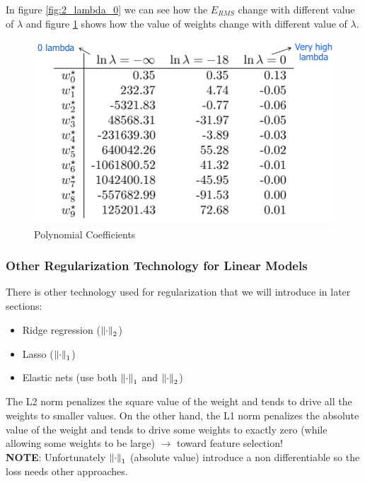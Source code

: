 \documentclass[../main.tex]{subfiles}
\begin{document}
In figure \ref{fig:2_lambda_0} we can see how the $E_{RMS}$ change with different value of $\lambda$ and figure \ref{fig:2_poly_coeff_with_reg} shows how the value of weights change with different value of $\lambda$.

\begin{figure}[H]
    \centering
    \includegraphics[scale = 0.3]{lectures/2_linear_model/2_polynomial_coefficients.png}
    \caption{Polynomial Coefficients}
    \label{fig:2_poly_coeff_with_reg}
\end{figure}


\subsubsection{Other Regularization Technology for Linear Models}
There is other technology used for regularization that we will introduce in later sections:
\begin{itemize}
    \item Ridge regression ($\left\lVert\cdot\right\rVert_2$)
    \item Lasso ($\left\lVert\cdot\right\rVert_1$)
    \item Elastic nets (use both $\left\lVert\cdot\right\rVert_1$ and $\left\lVert\cdot\right\rVert_2$)
\end{itemize}

The L2 norm penalizes the square value of the weight and tends to drive all the weights to smaller values. On the other hand, the L1 norm penalizes the absolute value of the weight and tends to drive some weights to exactly zero (while allowing some weights to be large) $\rightarrow$ toward feature selection!\\

\textbf{NOTE}: Unfortunately $\left\lVert\cdot\right\rVert_1$ (absolute value) introduce a non differentiable so the loss needs other approaches.
\end{document}
